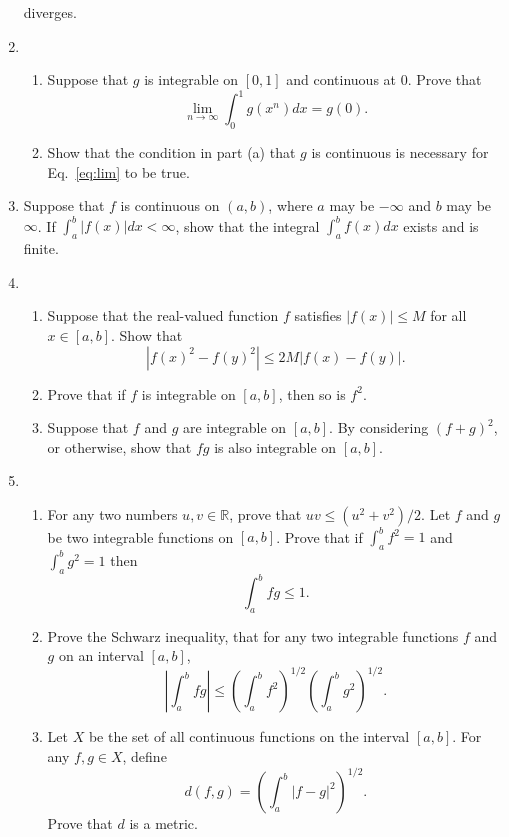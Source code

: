 \documentclass[12pt]{article}
\newcommand{\R}{\mathbb{R}}
\begin{document}
\begin{enumerate}
    diverges.
  \item
    \begin{enumerate}
      \item Suppose that $g$ is integrable on $[0,1]$ and continuous at 0. Prove
        that
        \begin{equation}
          \lim_{n\to\infty} \int_0^1 g(x^n) dx = g(0).
          \label{eq:lim}
        \end{equation}
      \item Show that the condition in part (a) that $g$ is continuous is
        necessary for Eq.~\eqref{eq:lim} to be true.
    \end{enumerate}
  \item Suppose that $f$ is continuous on $(a,b)$, where $a$ may be $-\infty$
    and $b$ may be $\infty$. If $\int_a^b |f(x)|dx <\infty$, show that the
    integral $\int_a^b f(x) dx$ exists and is finite.
  \item
    \begin{enumerate}
      \item Suppose that the real-valued function $f$ satisfies $|f(x)|\le M$
        for all $x\in[a,b]$. Show that
        \begin{equation}
          \left|f(x)^2-f(y)^2 \right| \le 2M |f(x)-f(y)|.
        \end{equation}
      \item Prove that if $f$ is integrable on $[a,b]$, then so is $f^2$.
      \item Suppose that $f$ and $g$ are integrable on $[a,b]$. By considering
        $(f+g)^2$, or otherwise, show that $fg$ is also integrable on $[a,b]$.
    \end{enumerate}
  \item
    \begin{enumerate}
      \item For any two numbers $u,v\in \R$, prove that $uv \le (u^2+v^2)/2$.
        Let $f$ and $g$ be two integrable functions on $[a,b]$. Prove that if
        $\int_a^b f^2 = 1$ and $\int_a^b g^2 = 1$ then
        \begin{equation}
          \int_a^b fg \le 1.
        \end{equation}
      \item
        Prove the Schwarz inequality, that for any two integrable functions $f$
        and $g$ on an interval $[a,b]$,
        \begin{equation}
          \left| \int_a^b fg\right| \le \left( \int_a^b f^2
          \right)^{1/2} \left( \int_a^b g^2 \right)^{1/2}.
        \end{equation}
      \item Let $X$ be the set of all continuous functions on the interval
        $[a,b]$. For any $f,g\in X$, define
        \begin{equation}
          d(f,g) = \left(\int_a^b |f-g|^2 \right)^{1/2}.
        \end{equation}
        Prove that $d$ is a metric.
    \end{enumerate}
\end{enumerate}
\end{document}
